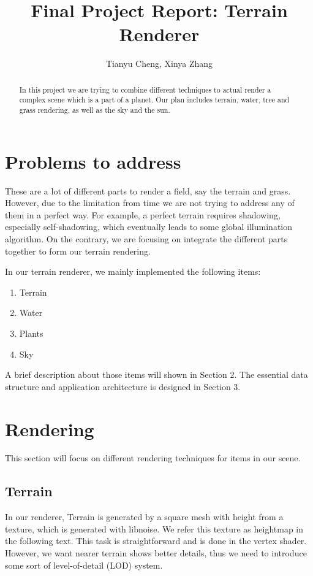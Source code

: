 \documentclass[10pt,twocolumn]{article}
\author{Tianyu Cheng, Xinya Zhang}
\title{Final Project Report: Terrain Renderer}
\begin{document}
\maketitle
\begin{abstract}
	In this project we are trying to combine different techniques to
	actual render a complex scene which is a part of a planet. Our plan
	includes terrain, water, tree and grass rendering, as well as the sky
	and the sun.
\end{abstract}

\section{Problems to address}

These are a lot of different parts to render a field, say the terrain and
grass. However, due to the limitation from time we are not
trying to address any of them in a perfect way. For example, a perfect terrain
requires shadowing, especially self-shadowing, which eventually leads to some
global illumination algorithm. On the contrary, we are focusing on integrate
the different parts together to form our terrain rendering.

In our terrain renderer, we mainly implemented the following items:
\begin{enumerate}
	\item Terrain
	\item Water
	\item Plants
	\item Sky
\end{enumerate}

A brief description about those items will shown in Section 2. The essential
data structure and application architecture is designed in Section 3.

\section{Rendering}

This section will focus on different rendering techniques for items in our
scene.

\subsection{Terrain}

In our renderer, Terrain is generated by a square mesh with height from a
texture, which is generated with libnoise\cite{libnoise}. We refer this texture as heightmap in the following text. This task
is straightforward and is done in the vertex shader. However, we want nearer
terrain shows better details, thus we need to introduce some sort of
level-of-detail (LOD) system.
\end{document}
